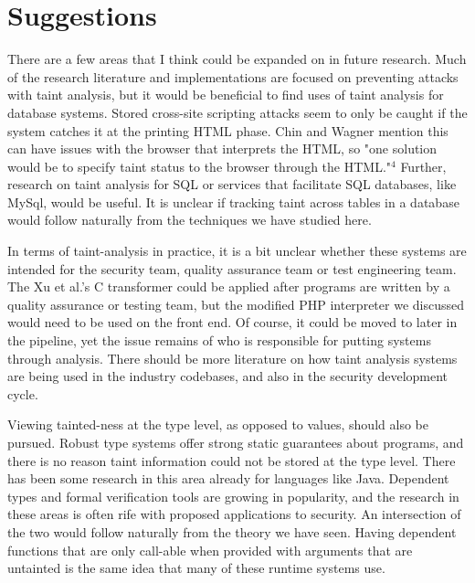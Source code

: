 \documentclass[11pt]{article}
\begin{document}
%
%
%



\section*{Suggestions}

There are a few areas that I think could be expanded on in future research. 
Much of the research literature and implementations are focused on preventing attacks
with taint analysis, but it would be beneficial to find uses of taint analysis
for database systems. Stored cross-site scripting attacks seem to only be caught
if the system catches it at the printing HTML phase. Chin and Wagner mention this 
can have issues with the browser that interprets the HTML, so "one solution would 
be to specify taint status to the browser through the HTML."$^4$ 
Further, research on taint analysis for SQL or services that facilitate SQL 
databases, like MySql, would be useful. It is unclear if tracking taint across
tables in a database would follow naturally from the techniques we have studied here.

In terms of taint-analysis in practice, it is a bit unclear whether these systems
are intended for the security team, quality assurance team or test engineering team.
The Xu et al.'s C transformer could be applied after programs are written by a quality
assurance or testing team, but the modified PHP interpreter we discussed would need to
be used on the front end. Of course, it could be moved to later in the pipeline,
yet the issue remains of who is responsible for putting systems through analysis.
There should be more literature on how taint analysis systems are being used in
the industry codebases, and also in the security development cycle. 

Viewing tainted-ness at the type level, as opposed to values, should also be pursued. 
Robust type systems offer strong static guarantees about programs, and there is no
reason taint information could not be stored at the type level. There has been
some research in this area already for languages like Java. Dependent types and
formal verification tools are growing in popularity, and the research in these areas
is often rife with proposed applications to security. An intersection of the two
would follow naturally from the theory we have seen. Having dependent functions that
are only call-able when provided with arguments that are untainted is the same idea
that many of these runtime systems use. 
\end{document}
